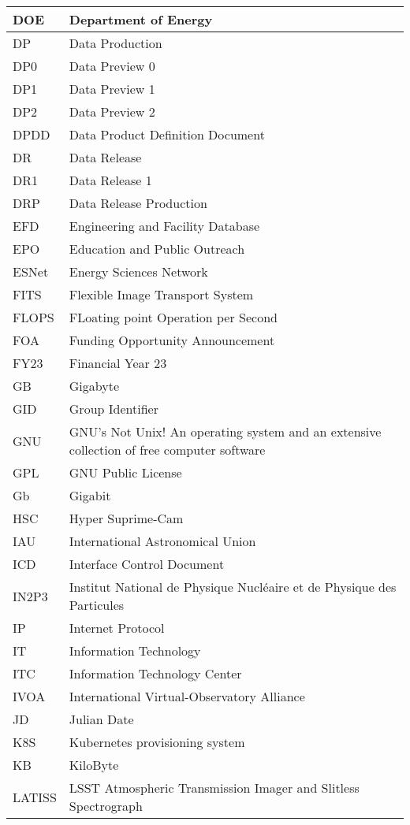 \begin{longtable}{p{}p{}}
DOE & Department of Energy \\\hline
DP & Data Production \\\hline
DP0 & Data Preview 0 \\\hline
DP1 & Data Preview 1 \\\hline
DP2 & Data Preview 2 \\\hline
DPDD & Data Product Definition Document \\\hline
DR & Data Release \\\hline
DR1 & Data Release 1 \\\hline
DRP & Data Release Production \\\hline
EFD & Engineering and Facility Database \\\hline
EPO & Education and Public Outreach \\\hline
ESNet & Energy Sciences Network \\\hline
FITS & Flexible Image Transport System \\\hline
FLOPS & FLoating point Operation per Second \\\hline
FOA & Funding Opportunity Announcement \\\hline
FY23 & Financial Year 23 \\\hline
GB & Gigabyte \\\hline
GID & Group Identifier \\\hline
GNU & GNU's Not Unix! An operating system and an extensive collection of free computer software \\\hline
GPL & GNU Public License \\\hline
Gb & Gigabit \\\hline
HSC & Hyper Suprime-Cam \\\hline
IAU & International Astronomical Union \\\hline
ICD & Interface Control Document \\\hline
IN2P3 & Institut National de Physique Nucléaire et de Physique des Particules \\\hline
IP & Internet Protocol \\\hline
IT & Information Technology \\\hline
ITC & Information Technology Center \\\hline
IVOA & International Virtual-Observatory Alliance \\\hline
JD & Julian Date \\\hline
K8S & Kubernetes provisioning system \\\hline
KB & KiloByte \\\hline
LATISS & LSST Atmospheric Transmission Imager and Slitless Spectrograph \\\hline

\end{longtable}
